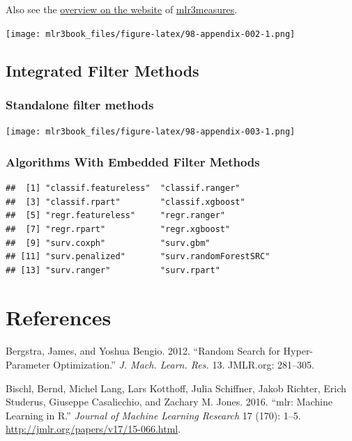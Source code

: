 \documentclass[
  11pt,
  parskip=half,
  DIV=calc,
  BCOR=10mm,
  x11names]{scrbook}
\begin{document}
Also see the \href{https://mlr3measures.mlr-org.com/reference/}{overview on the website} of \href{https://mlr3measures.mlr-org.com}{mlr3measures}.

\texttt{[image: mlr3book\_files/figure-latex/98-appendix-002-1.png]}

\hypertarget{list-filters}{%
\section{Integrated Filter Methods}\label{list-filters}}

\hypertarget{fs-filter-list}{%
\subsection{Standalone filter methods}\label{fs-filter-list}}

\texttt{[image: mlr3book\_files/figure-latex/98-appendix-003-1.png]}

\hypertarget{fs-filter-embedded-list}{%
\subsection{Algorithms With Embedded Filter Methods}\label{fs-filter-embedded-list}}

\begin{verbatim}
##  [1] "classif.featureless"  "classif.ranger"      
##  [3] "classif.rpart"        "classif.xgboost"     
##  [5] "regr.featureless"     "regr.ranger"         
##  [7] "regr.rpart"           "regr.xgboost"        
##  [9] "surv.coxph"           "surv.gbm"            
## [11] "surv.penalized"       "surv.randomForestSRC"
## [13] "surv.ranger"          "surv.rpart"
\end{verbatim}

\hypertarget{references}{%
\chapter{References}\label{references}}

\hypertarget{refs}{}
\leavevmode\hypertarget{ref-bergstra2012}{}%
Bergstra, James, and Yoshua Bengio. 2012. ``Random Search for Hyper-Parameter Optimization.'' \emph{J. Mach. Learn. Res.} 13. JMLR.org: 281--305.

\leavevmode\hypertarget{ref-mlr}{}%
Bischl, Bernd, Michel Lang, Lars Kotthoff, Julia Schiffner, Jakob Richter, Erich Studerus, Giuseppe Casalicchio, and Zachary M. Jones. 2016. ``mlr: Machine Learning in R.'' \emph{Journal of Machine Learning Research} 17 (170): 1--5. \url{http://jmlr.org/papers/v17/15-066.html}.
\end{document}
